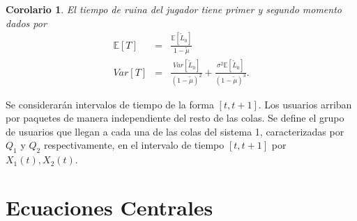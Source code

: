 \documentclass{article}
\newtheorem{Coro}{Corolario}
\newcommand{\esp}{\mathbb{E}}
\begin{document}
\begin{Coro}
El tiempo de ruina del jugador tiene primer y segundo momento dados por
\begin{eqnarray}
\esp\left[T\right]&=&\frac{\esp\left[\tilde{L}_{0}\right]}{1-\tilde{\mu}}\\
Var\left[T\right]&=&\frac{Var\left[\tilde{L}_{0}\right]}{\left(1-\tilde{\mu}\right)^{2}}+\frac{\sigma^{2}\esp\left[\tilde{L}_{0}\right]}{\left(1-\tilde{\mu}\right)^{3}}.
\end{eqnarray}
\end{Coro}

Se considerar\'an intervalos de tiempo de la forma
$\left[t,t+1\right]$. Los usuarios arriban por paquetes de manera
independiente del resto de las colas. Se define el grupo de
usuarios que llegan a cada una de las colas del sistema 1,
caracterizadas por $Q_{1}$ y $Q_{2}$ respectivamente, en el
intervalo de tiempo $\left[t,t+1\right]$ por
$X_{1}\left(t\right),X_{2}\left(t\right)$.


\section{Ecuaciones Centrales}
\end{document}
